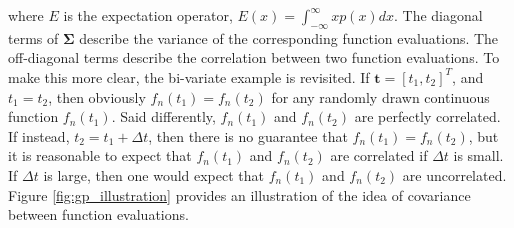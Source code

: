 \documentclass{article}
\begin{document}
\noindent where $E$ is the expectation operator, $E(x) =  \int_{-\infty}^{\infty} xp(x) dx$. The diagonal terms of  $\boldsymbol{\Sigma}$ describe the variance of the corresponding function evaluations. The off-diagonal terms describe the correlation between two function evaluations. To make this more clear, the bi-variate example is revisited. If $\boldsymbol{t} = [t_1, t_2]^T$, and $t_1 = t_2$, then obviously $f_n(t_1) = f_n(t_2)$ for any randomly drawn continuous function $f_n(t_1)$. Said differently, $f_n(t_1)$ and $f_n(t_2)$ are perfectly correlated. If instead, $t_2 = t_1 + \Delta t$, then there is no guarantee that $f_n(t_1) = f_n(t_2)$, but it is reasonable to expect that $f_n(t_1)$ and $f_n(t_2)$ are correlated if $\Delta t$ is small. If $\Delta t$ is large, then one would expect that $f_n(t_1)$ and $f_n(t_2)$ are uncorrelated. Figure \ref{fig:gp_illustration} provides an illustration of the idea of covariance between function evaluations. 
\end{document}
